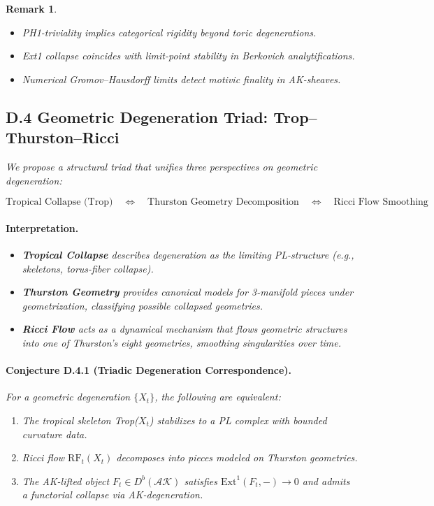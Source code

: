\documentclass[11pt]{article}
\newtheorem{remark}[theorem]{Remark}
\begin{document}
\begin{remark}
\begin{itemize}
  \item PH1-triviality implies categorical rigidity beyond toric degenerations.
  \item Ext1 collapse coincides with limit-point stability in Berkovich analytifications.
  \item Numerical Gromov–Hausdorff limits detect motivic finality in AK-sheaves.
\end{itemize}

\subsection*{D.4 Geometric Degeneration Triad: Trop–Thurston–Ricci}

We propose a structural triad that unifies three perspectives on geometric degeneration:

\[
\text{Tropical Collapse (Trop)} \quad \Leftrightarrow \quad \text{Thurston Geometry Decomposition} \quad \Leftrightarrow \quad \text{Ricci Flow Smoothing}
\]

\paragraph{Interpretation.}
\begin{itemize}
  \item \textbf{Tropical Collapse} describes degeneration as the limiting PL-structure (e.g., skeletons, torus-fiber collapse).
  \item \textbf{Thurston Geometry} provides canonical models for 3-manifold pieces under geometrization, classifying possible collapsed geometries.
  \item \textbf{Ricci Flow} acts as a dynamical mechanism that flows geometric structures into one of Thurston’s eight geometries, smoothing singularities over time.
\end{itemize}

\paragraph{Conjecture D.4.1 (Triadic Degeneration Correspondence).}
For a geometric degeneration \( \{X_t\} \), the following are equivalent:

\begin{enumerate}
  \item The tropical skeleton Trop(\(X_t\)) stabilizes to a PL complex with bounded curvature data.
  \item Ricci flow \( \mathrm{RF}_t(X_t) \) decomposes into pieces modeled on Thurston geometries.
  \item The AK-lifted object \( F_t \in D^b(\mathcal{AK}) \) satisfies \( \mathrm{Ext}^1(F_t, -) \to 0 \) and admits a functorial collapse via AK-degeneration.
\end{enumerate}


\end{remark}
\end{document}
